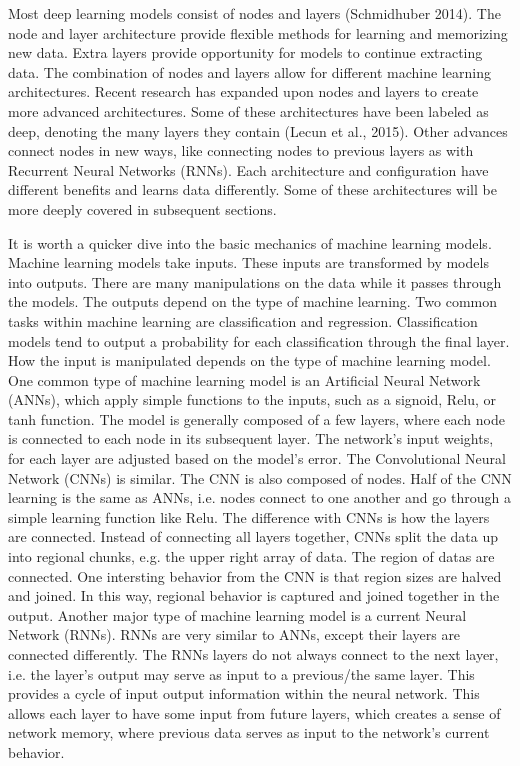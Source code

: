 Most deep learning models consist of nodes and layers (Schmidhuber 2014).  The node and layer architecture provide flexible methods for learning and memorizing new data.  Extra layers provide opportunity for models to continue extracting data.  The combination of nodes and layers allow for different machine learning architectures.  Recent research has expanded upon nodes and layers to create more advanced architectures.  Some of these architectures have been labeled as deep, denoting the many layers they contain (Lecun et al., 2015). Other advances connect nodes in new ways, like connecting nodes to previous layers as with Recurrent Neural Networks (RNNs).  Each architecture and configuration have different benefits and learns data differently.  Some of these architectures will be more deeply covered in subsequent sections.  

It is worth a quicker dive into the basic mechanics of machine learning models. Machine learning models take inputs.  These inputs are transformed by models into outputs.  There are many manipulations on the data while it passes through the models.  The outputs depend on the type of machine learning.  Two common tasks within machine learning are classification and regression.  Classification models tend to output a probability for each classification through the final layer.  How the input is manipulated depends on the type of machine learning model.  One common type of machine learning model is an Artificial Neural Network (ANNs), which apply simple functions to the inputs, such as a signoid, Relu, or tanh function.  The model is generally composed of a few layers, where each node is connected to each node in its subsequent layer.  The network's input weights, for each layer are adjusted based on the model's error.  The Convolutional Neural Network (CNNs) is similar.  The CNN is also composed of nodes.  Half of the CNN learning is the same as ANNs, i.e. nodes connect to one another and go through a simple learning function like Relu.  The difference with CNNs is how the layers are connected.  Instead of connecting all layers together, CNNs split the data up into regional chunks, e.g. the upper right array of data.  The region of datas are connected.  One intersting behavior from the CNN is that region sizes are halved and joined.  In this way, regional behavior is captured and joined together in the output.  Another major type of machine learning model is a current Neural Network (RNNs).  RNNs are very similar to ANNs, except their layers are connected differently.  The RNNs layers do not always connect to the next layer, i.e. the layer's output may serve as input to a previous/the same layer.  This provides a cycle of input output information within the neural network.  This allows each layer to have some input from future layers, which creates a sense of network memory, where previous data serves as input to the network's current behavior.  

